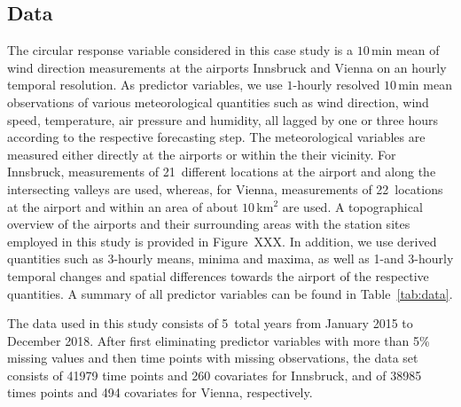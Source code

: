 \documentclass[nojss]{jss}
\numberwithin{equation}{section}
\begin{document}
\subsection{Data}\label{sec:wind:data}
The circular response variable considered in this case study is a $10$\,min mean
of wind direction measurements at the airports Innsbruck and Vienna on an hourly
temporal resolution. As predictor variables, we use $1$-hourly resolved
$10$\,min mean observations of various meteorological quantities such as wind
direction, wind speed, temperature, air pressure and humidity, all
lagged by one or three hours according to the respective forecasting step. The
meteorological variables are measured either directly at the airports or within
the their vicinity. For Innsbruck, measurements of
21~different locations at the airport and along the intersecting valleys are
used, whereas, for Vienna, measurements of 22~locations at the airport and
within an area of about $10$\,km$^2$ are used. A topographical overview of the
airports and their surrounding areas with the station sites employed in this
study is provided in Figure~XXX. In addition, we use derived quantities such
as 3-hourly means, minima and maxima, as well as 1-and 3-hourly temporal
changes and spatial differences towards the airport of the respective
quantities. A summary of all predictor variables can be found in
Table~\ref{tab:data}. 

The data used in this study consists of 5~total years from January 2015 to
December 2018. After first eliminating predictor variables with more than 5\% missing
values and then time points with missing observations, the
data set consists of 41979 time points and 260 covariates for Innsbruck, and of
38985 times points and 494 covariates for Vienna, respectively.
\end{document}

